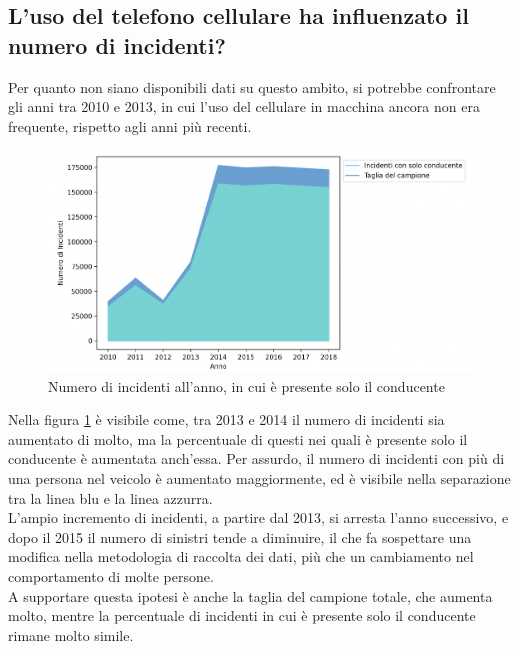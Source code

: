 \documentclass[a4paper]{report}
\begin{document}

\subsection{L'uso del telefono cellulare ha influenzato il numero di incidenti?}

Per quanto non siano disponibili dati su questo ambito, si potrebbe confrontare gli 
anni tra 2010 e 2013, in cui l'uso del cellulare in macchina ancora non era frequente, 
rispetto agli anni più recenti.


\begin{figure}
    \includegraphics[width=\linewidth]{../src/incidenti/incidenti_senza_coords/anno/incremento_incidenti.png}
    \caption{Numero di incidenti all'anno, in cui è presente solo il conducente}
    \label{fig:incremento-incidenti}
\end{figure}

Nella figura \ref{fig:incremento-incidenti} è visibile come, 
tra 2013 e 2014 il numero di incidenti sia aumentato di molto, 
ma la percentuale di questi nei quali è presente solo il conducente è aumentata anch'essa.
Per assurdo, il numero di incidenti con più di una persona nel veicolo è aumentato maggiormente, 
ed è visibile nella separazione tra la linea blu e la linea azzurra.\\

L'ampio incremento di incidenti, a partire dal 2013, si arresta l'anno successivo, e dopo il 2015 
il numero di sinistri tende a diminuire, il che fa sospettare una modifica nella metodologia 
di raccolta dei dati, più che un cambiamento nel comportamento di molte persone.\\
A supportare questa ipotesi è anche la taglia del campione totale, che aumenta molto, mentre la 
percentuale di incidenti in cui è presente solo il conducente rimane molto simile.
\end{document}

